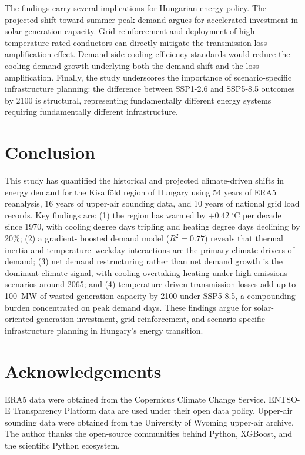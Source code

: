 \documentclass[11pt,a4paper]{article}
\begin{document}
The findings carry several implications for Hungarian energy policy.
The projected shift toward summer-peak demand argues for accelerated
investment in solar generation capacity. Grid reinforcement and
deployment of high-temperature-rated conductors can directly mitigate
the transmission loss amplification effect. Demand-side cooling
efficiency standards would reduce the cooling demand growth underlying
both the demand shift and the loss amplification. Finally, the study
underscores the importance of scenario-specific infrastructure planning:
the difference between SSP1-2.6 and SSP5-8.5 outcomes by 2100 is
structural, representing fundamentally different energy systems
requiring fundamentally different infrastructure.

\section{Conclusion}
\label{sec:conclusion}

This study has quantified the historical and projected climate-driven
shifts in energy demand for the Kisalf\"{o}ld region of Hungary using
54 years of ERA5 reanalysis, 16 years of upper-air sounding data, and
10 years of national grid load records. Key findings are: (1) the region
has warmed by $+0.42~^\circ$C per decade since 1970, with cooling degree
days tripling and heating degree days declining by 20\%; (2) a gradient-
boosted demand model ($R^2 = 0.77$) reveals that thermal inertia and
temperature--weekday interactions are the primary climate drivers of
demand; (3) net demand restructuring rather than net demand growth is
the dominant climate signal, with cooling overtaking heating under
high-emissions scenarios around 2065; and (4) temperature-driven
transmission losses add up to 100~MW of wasted generation capacity by
2100 under SSP5-8.5, a compounding burden concentrated on peak demand
days. These findings argue for solar-oriented generation investment,
grid reinforcement, and scenario-specific infrastructure planning in
Hungary's energy transition.

\section*{Acknowledgements}

ERA5 data were obtained from the Copernicus Climate Change Service.
ENTSO-E Transparency Platform data are used under their open data
policy. Upper-air sounding data were obtained from the University of
Wyoming upper-air archive. The author thanks the open-source communities
behind Python, XGBoost, and the scientific Python ecosystem.
\end{document}
